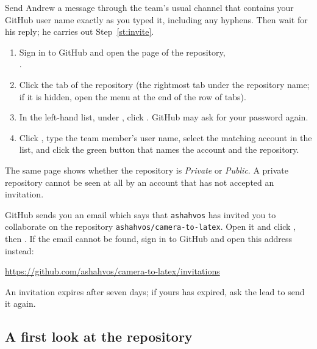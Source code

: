 \label{st:sendname}
Send Andrew a message through the team's usual channel that contains your GitHub user name
exactly as you typed it, including any hyphens. Then wait for his reply; he carries out
Step~\ref{st:invite}.

\label{st:invite}
\begin{enumerate}
\item Sign in to GitHub and open the page of the repository,\\ \repourl.
\item Click the  tab of the repository (the rightmost tab under the repository
  name; if it is hidden, open the \ui{\ldots} menu at the end of the row of tabs).
\item In the left-hand list, under , click . GitHub may ask for
  your password again.
\item Click , type the team member's user name, select the matching account in
  the list, and click the green button that names the account and the repository.
\end{enumerate}
The same page shows whether the repository is \emph{Private} or \emph{Public}. A private
repository cannot be seen at all by an account that has not accepted an invitation.

GitHub sends you an email which says that \texttt{ashahvos} has invited you to collaborate on
the repository \texttt{ashahvos/camera-to-latex}. Open it and click , then
.
If the email cannot be found, sign in to GitHub and open this address instead:
\begin{center}\url{https://github.com/ashahvos/camera-to-latex/invitations}\end{center}
An invitation expires after seven days; if yours has expired, ask the lead to send it again.

\subsection{A first look at the repository}

